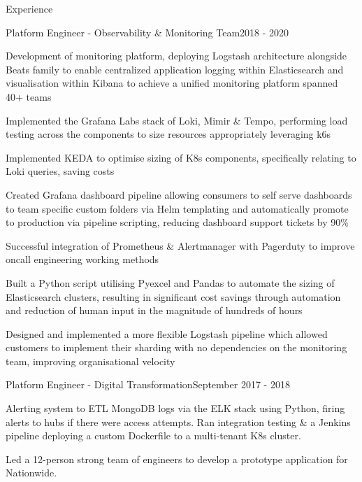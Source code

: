 \documentclass{resume} %
\begin{document}
\begin{rSection}{Experience}
\begin{rSubsection}{}{}{Platform Engineer - Observability \& Monitoring Team}{2018 - 2020}
\normalfont
\item Development of monitoring platform, deploying Logstash architecture alongside Beats family to enable centralized application logging within Elasticsearch and visualisation within Kibana to achieve a unified monitoring platform spanned 40+ teams %
\item Implemented the Grafana Labs stack of Loki, Mimir \& Tempo, performing load testing across the components to size resources appropriately leveraging k6s %
\item Implemented KEDA to optimise sizing of K8s components, specifically relating to Loki queries, saving costs %
\item Created Grafana dashboard pipeline allowing consumers to self serve dashboards to team specific custom folders via Helm templating and automatically promote to production via pipeline scripting, reducing dashboard support tickets by 90\% %
\item Successful integration of Prometheus \& Alertmanager with Pagerduty to improve oncall engineering working methods %
\item Built a Python script utilising Pyexcel and Pandas to automate the sizing of Elasticsearch clusters, resulting in significant cost savings through automation and reduction of human input in the magnitude of hundreds of hours %
\item Designed and implemented a more flexible Logstash pipeline which allowed customers to implement their sharding with no dependencies on the monitoring team, improving organisational velocity %
\end{rSubsection}

\begin{rSubsection}{}{}{Platform Engineer - Digital Transformation}{September 2017 - 2018}
\normalfont
\item Alerting system to ETL MongoDB logs via the ELK stack using Python, firing alerts to hubs if there were access attempts. Ran integration testing \& a Jenkins pipeline deploying a custom Dockerfile to a multi-tenant K8s cluster. %
\item Led a 12-person strong team of engineers to develop a prototype application for Nationwide. %
\end{rSubsection}


\end{rSection}
\end{document}
